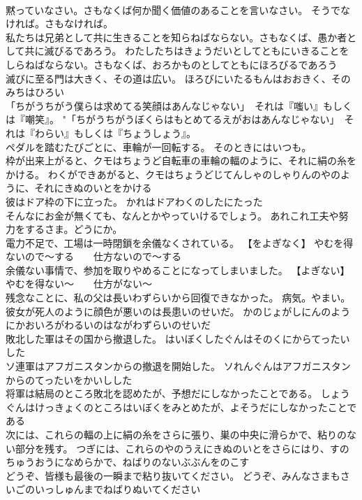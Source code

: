 \documentclass[8pt]{extreport}
\begin{document}
\begin{CJK}{UTF8}{min}
\\	黙っていなさい。さもなくば何か聞く価値のあることを言いなさい。	そうでなければ。さもなければ。
\\	私たちは兄弟として共に生きることを知らねばならない。さもなくば、愚か者として共に滅びるであろう。	わたしたちはきょうだいとしてともにいきることをしらねばならない。さもなくば、おろかものとしてともにほろびるであろう 
\\	滅びに至る門は大きく、その道は広い。	ほろびにいたるもんはおおきく、そのみちはひろい 
\\	「ちがうちがう僕らは求めてる笑顔はあんなじゃない」　それは『嗤い』もしくは『嘲笑』。	"「ちがうちがうぼくらはもとめてるえがおはあんなじゃない」　それは『わらい』もしくは『ちょうしょう』。 
\\	ペダルを踏むたびごとに、車輪が一回転する。	そのときにはいつも。
\\	枠が出来上がると、クモはちょうど自転車の車輪の輻のように、それに絹の糸をかける。	わくができあがると、クモはちょうどじてんしゃのしゃりんのやのように、それにきぬのいとをかける 
\\	彼はドア枠の下に立った。	かれはドアわくのしたにたった 
\\	そんなにお金が無くても、なんとかやっていけるでしょう。	あれこれ工夫や努力をするさま。どうにか。
\\	電力不足で、工場は一時閉鎖を余儀なくされている。	【をよぎなく】 やむを得ないので～する　　仕方ないので～する
\\	余儀ない事情で、参加を取りやめることになってしまいました。	【よぎない】 やむを得ない～　　仕方がない～
\\	残念なことに、私の父は長いわずらいから回復できなかった。	病気。やまい。
\\	彼女が死人のように顔色が悪いのは長患いのせいだ。	かのじょがしにんのようにかおいろがわるいのはながわずらいのせいだ 
\\	敗北した軍はその国から撤退した。	はいぼくしたぐんはそのくにからてったいした 
\\	ソ連軍はアフガニスタンからの撤退を開始した。	ソれんぐんはアフガニスタンからのてったいをかいしした 
\\	将軍は結局のところ敗北を認めたが、予想だにしなかったことである。	しょうぐんはけっきょくのところはいぼくをみとめたが、よそうだにしなかったことである 
\\	次には、これらの輻の上に絹の糸をさらに張り、巣の中央に滑らかで、粘りのない部分を残す。	つぎには、これらのやのうえにきぬのいとをさらにはり、すのちゅうおうになめらかで、ねばりのないぶぶんをのこす 
\\	どうぞ、皆様も最後の一瞬まで粘り抜いてください。	どうぞ、みんなさまもさいごのいっしゅんまでねばりぬいてください 

\end{CJK}
\end{document}
